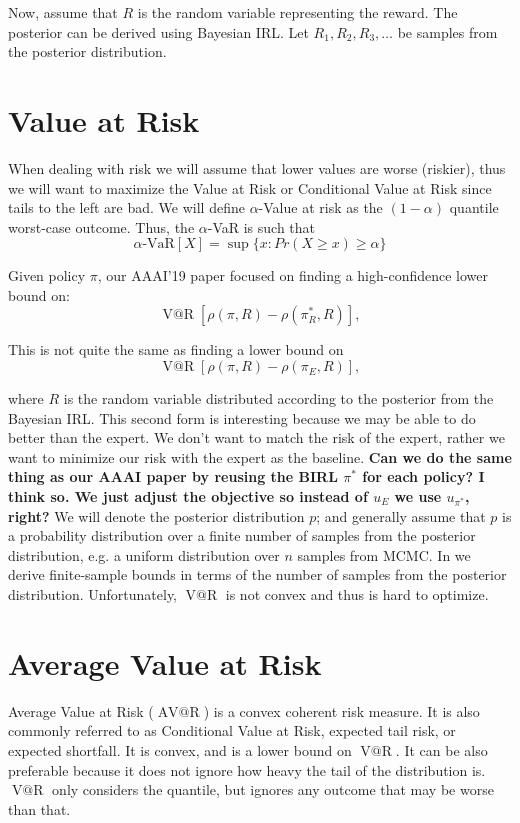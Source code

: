 \documentclass{article}
\makeatletter
\DeclareMathOperator{\var}{V@R}
\DeclareMathOperator{\avar}{AV@R}
\makeatother
\begin{document}
	
	Now, assume that $R$ is the random variable representing the reward. The posterior can be derived using Bayesian IRL. Let $R_1, R_2, R_3, \ldots$ be samples from the posterior distribution.


\section{Value at Risk}
When dealing with risk we will assume that lower values are worse (riskier), thus we will want to maximize the Value at Risk or Conditional Value at Risk since tails to the left are  bad. We will define $\alpha$-Value at risk as the $(1-\alpha)$ quantile worst-case outcome. Thus, the $\alpha$-VaR is such that 
\begin{equation}
\alpha\text{-VaR}[X] = \sup \{x : Pr(X \geq x) \geq \alpha\}
\end{equation}
	
	Given policy $\pi$, our AAAI'19 paper \cite{Brown2017} focused on finding a high-confidence lower bound on:
	\[ \var\left[\rho(\pi, R) - \rho(\pi^*_R, R) \right] ,\]

This is not quite the same as finding a lower bound on 
	\[ \var\left[\rho(\pi, R) - \rho(\pi_E, R) \right] ,\]	

	where $R$ is the random variable distributed according to the posterior from the Bayesian IRL. This second form is interesting because we may be able to do better than the expert. We don't want to match the risk of the expert, rather we want to minimize our risk with the expert as the baseline. \textbf{Can we do the same thing as our AAAI paper by reusing the BIRL $\pi^*$ for each policy? I think so. We just adjust the objective so instead of $u_E$ we use $u_{\pi^*}$, right?} We will denote the posterior distribution $p$; and generally assume that $p$ is a probability distribution over a finite number of samples from the posterior distribution, e.g. a uniform distribution over $n$ samples from MCMC. In \cite{Brown2017} we derive finite-sample bounds in terms of the number of samples from the posterior distribution. Unfortunately, $\var$ is not convex and thus is hard to optimize.


\section{Average Value at Risk}
Average Value at Risk ($\avar$) is a convex coherent risk measure. It is also commonly referred to as Conditional Value at Risk, expected tail risk, or expected shortfall. It is convex, and is a lower bound on $\var$. It can be also preferable because it does not ignore how heavy the tail of the distribution is. $\var$ only considers the quantile, but ignores any outcome that may be worse than that.
	
\end{document}
